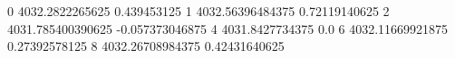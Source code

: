 0 4032.2822265625 0.439453125
1 4032.56396484375 0.72119140625
2 4031.785400390625 -0.057373046875
4 4031.8427734375 0.0
6 4032.11669921875 0.27392578125
8 4032.26708984375 0.42431640625
